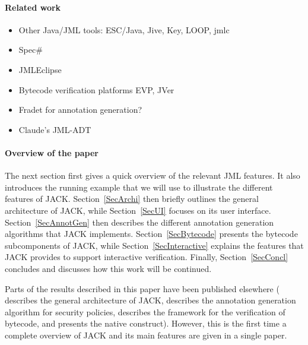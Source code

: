 \paragraph{Related work}
\begin{itemize}
\item Other Java/JML tools: ESC/Java, Jive, Key, LOOP, jmlc
\item Spec\#
\item JMLEclipse
\item Bytecode verification platforms EVP, JVer
\item Fradet for annotation generation?
\item Claude's JML-ADT
\end{itemize}

\paragraph{Overview of the paper}
The next section first gives a quick overview of the relevant JML
features. It also introduces the running example that we will use to
illustrate the different features of JACK. Section~\ref{SecArchi} then
briefly outlines the general architecture of JACK, while
Section~\ref{SecUI} focuses on its user
interface. Section~\ref{SecAnnotGen} then describes the different
annotation generation algorithms that JACK
implements. Section~\ref{SecBytecode} presents the bytecode
subcomponents of JACK, while Section~\ref{SecInteractive} explains the
features that JACK provides to support interactive
verification. Finally, Section~\ref{SecConcl} concludes and discusses
how this work will be continued.

Parts of the results described in this paper have been published
elsewhere (\cite{BurdyRL03} describes the general architecture of
JACK, \cite{PavlovaBBHL04cardis} describes the annotation generation
algorithm for security policies, \cite{BP06JSV} describes the
framework for the verification of bytecode, and \cite{Charles06}
presents the native construct). However, this is the first time a
complete overview of JACK and its main features are given in a single
paper.



